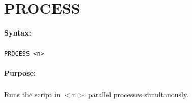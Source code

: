 
\newpage
\section{PROCESS}
\label{cmd:PROCESS}

\paragraph{Syntax:}
\subparagraph{}
\texttt{PROCESS <n>}

\paragraph{Purpose:}
\subparagraph{}
Runs the script in $<$n$>$ parallel processes simultanously.